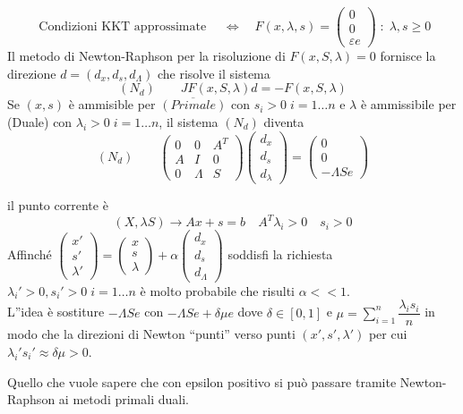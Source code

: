 $$
\text{ Condizioni KKT approssimate } \quad \Longleftrightarrow \quad
 F(x, \lambda , s) =
\begin{pmatrix}
  0 \\
 0 \\
 \varepsilon e
\end{pmatrix}\; : \; \lambda, s \geq 0
$$
Il metodo di Newton-Raphson per la risoluzione di $F(x, S, \lambda) = 0$
fornisce la direzione $d = (d_x, d_s, d_{\Lambda})$ che risolve il sistema
$$(N_d) \qquad JF( x, S, \lambda) d = - F(x, S , \lambda)$$
Se $(x,s)$ \`e ammisible per $\overline{(Primale)}$ con $s_i > 0 \; i=1\ldots n$
e $\lambda$ \`e ammissibile per (Duale) con $\lambda_i > 0 \; i = 1\ldots n$,
il sistema $(N_d)$ diventa
$$
(N_d) \qquad
\begin{pmatrix}
  0 & 0 & A^{T}   \\
  A & I & 0  \\
  0 & \Lambda & S 
\end{pmatrix}
\begin{pmatrix}
d_x \\
d_{s} \\
d_{\lambda}
\end{pmatrix}
=
\begin{pmatrix}
  0 \\
  0 \\
 - \Lambda Se
\end{pmatrix}
$$

il punto corrente \`e
$$ (X, \lambda S) \rightarrow Ax +s = b \quad A^{T} \lambda_i > 0
\quad s_i > 0
$$
Affinch\'e
$
\begin{pmatrix}
  x'  \\
 s' \\
 \lambda'
\end{pmatrix}
=
\begin{pmatrix}
  x \\
 s \\
 \lambda 
\end{pmatrix}
+
\alpha
\begin{pmatrix}
  d_x \\
 d_s \\
 d_{\Lambda}
\end{pmatrix}
$
soddisfi la richiesta $\lambda_i' > 0, s_i' > 0 \;
i =1 \ldots n$  \`e molto probabile che risulti
$\alpha <<1 $. \\
L''idea \`e sostiture
$ - \Lambda S e$ con $-\Lambda Se + \delta \mu e$
dove $\delta \in [0,1]$ e
$ \mu = \displaystyle \sum_{i=1}^{n} \dfrac{\lambda_i s_i}{n}$
in modo che la direzioni di Newton ``punti'' verso punti
$(x', s', \lambda ')$ per cui $\lambda_i' s_i' \approx \delta \mu > 0$.
\begin{notes}
Quello che vuole sapere che con epsilon positivo si pu\`o passare
tramite Newton-Raphson ai metodi primali duali.
\end{notes}
